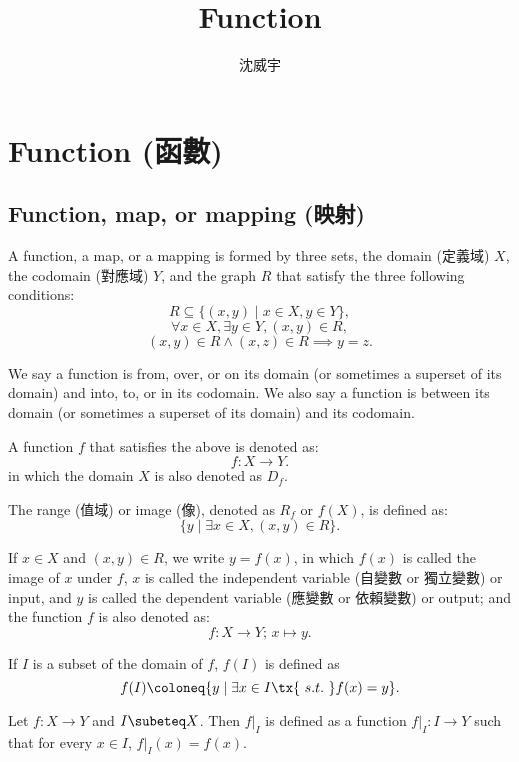 \documentclass[a4paper,12pt]{article}
\begin{document}
\title{Function}
\author{沈威宇}
\date{\temtoday}
\titletocdoc
\section{Function (函數)}
\subsection{Function, map, or mapping (映射)}
A function, a map, or a mapping is formed by three sets, the domain (定義域) $X$, the codomain (對應域) $Y$, and the graph $R$ that satisfy the three following conditions:
\[R\subseteq \{(x,y)\mid x\in X,y\in Y\},\]
\[\forall x\in X,\exists y\in Y,\left(x,y\right)\in R ,\]
\[ (x,y)\in R\land (x,z)\in R\implies y=z.\]

We say a function is from, over, or on its domain (or sometimes a superset of its domain) and into, to, or in its codomain. We also say a function is between its domain (or sometimes a superset of its domain) and its codomain.

A function $f$ that satisfies the above is denoted as:
\[f\colon X\to Y.\]
in which the domain $X$ is also denoted as $D_f$.

The range (值域) or image (像), denoted as $R_f$ or $f(X)$, is defined as:
\[\{ y \mid \exists x \in X, (x, y) \in R \}.\]

If $x\in X$ and $(x, y) \in R$, we write $y = f(x)$, in which $f(x)$ is called the image of $x$ under $f$, $x$ is called the independent variable (自變數 or 獨立變數) or input, and $y$ is called the dependent variable (應變數 or 依賴變數) or output; and the function $f$ is also denoted as:
\[f \colon X \to Y;\, x \mapsto y.\]

If $I$ is a subset of the domain of $f$, $f(I)$ is defined as
\[f(I)\coloneq\{y\mid\exists x\in I \tx{\ s.t.\ }f(x)=y\}.\]

Let $f\colon X\to Y$ and $I\subeteq X$. Then $f\vert_I$ is defined as a function $f\vert_I\colon I\to Y$ such that for every $x\in I$, $f\vert_I(x)=f(x)$.
\end{document}
